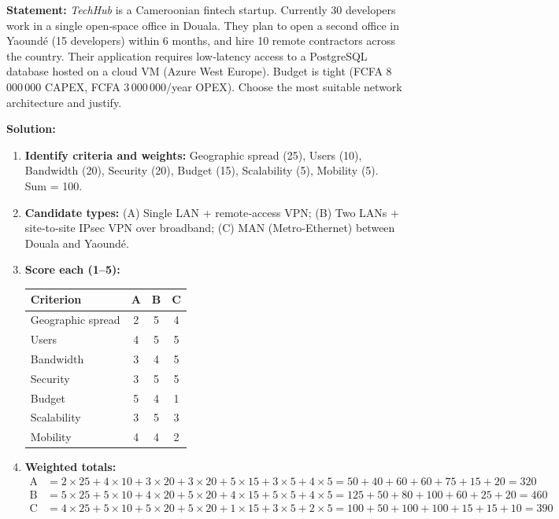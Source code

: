 \documentclass[11pt]{article}
\begin{document}
\begin{exoresolu}
\textbf{Statement:} \emph{TechHub} is a Cameroonian fintech startup. Currently 30 developers work in a single open‑space office in Douala. They plan to open a second office in Yaoundé (15 developers) within 6 months, and hire 10 remote contractors across the country. Their application requires low‑latency access to a PostgreSQL database hosted on a cloud VM (Azure West Europe). Budget is tight (FCFA 8\,000\,000 CAPEX, FCFA 3\,000\,000/year OPEX). Choose the most suitable network architecture and justify.

\tcblower
\textbf{Solution:}
\begin{enumerate}
\item \textbf{Identify criteria and weights:} Geographic spread (25), Users (10), Bandwidth (20), Security (20), Budget (15), Scalability (5), Mobility (5). Sum = 100.
\item \textbf{Candidate types:} (A) Single LAN + remote‑access VPN; (B) Two LANs + site‑to‑site IPsec VPN over broadband; (C) MAN (Metro‑Ethernet) between Douala and Yaoundé.
\item \textbf{Score each (1–5):}
\begin{center}
\begin{tabular}{|l|ccc|}
\hline
\rowcolor{popblueL}
\textbf{Criterion} & \textbf{A} & \textbf{B} & \textbf{C} \\
\hline
Geographic spread & 2 & 5 & 4 \\
Users & 4 & 5 & 5 \\
Bandwidth & 3 & 4 & 5 \\
Security & 3 & 5 & 5 \\
Budget & 5 & 4 & 1 \\
Scalability & 3 & 5 & 3 \\
Mobility & 4 & 4 & 2 \\
\hline
\end{tabular}
\end{center}
\item \textbf{Weighted totals:}
\begin{align*}
\text{A} &= 2\!\times\!25 + 4\!\times\!10 + 3\!\times\!20 + 3\!\times\!20 + 5\!\times\!15 + 3\!\times\!5 + 4\!\times\!5 = 50+40+60+60+75+15+20 = 320\\
\text{B} &= 5\!\times\!25 + 5\!\times\!10 + 4\!\times\!20 + 5\!\times\!20 + 4\!\times\!15 + 5\!\times\!5 + 4\!\times\!5 = 125+50+80+100+60+25+20 = 460\\
\text{C} &= 4\!\times\!25 + 5\!\times\!10 + 5\!\times\!20 + 5\!\times\!20 + 1\!\times\!15 + 3\!\times\!5 + 2\!\times\!5 = 100+50+100+100+15+15+10 = 390

\end{align*}
\end{enumerate}
\end{exoresolu}
\end{document}
